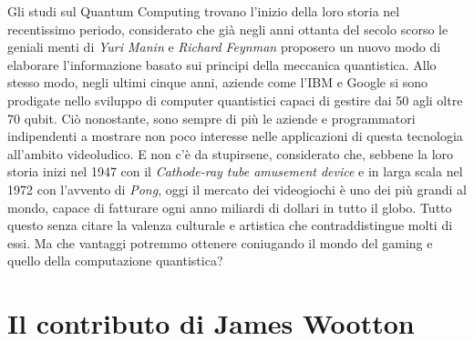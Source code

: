 \documentclass{book}
\theoremstyle{definition}
\theoremstyle{definition}
\theoremstyle{definition}
\theoremstyle{plain}
\theoremstyle{plain}
\theoremstyle{plain}
\theoremstyle{plain}
\begin{document}
Gli studi sul Quantum Computing trovano l'inizio della loro storia nel recentissimo periodo, considerato che già negli anni ottanta del secolo scorso le geniali menti di \emph{Yuri Manin} e \emph{Richard Feynman} proposero un nuovo modo di elaborare l'informazione basato sui principi della meccanica quantistica\cite{luciano_lenzini_quantum_history}. Allo stesso modo, negli ultimi cinque anni, aziende come l'IBM e Google si sono prodigate nello sviluppo di computer quantistici capaci di gestire dai 50 agli oltre 70 qubit. Ciò nonostante, sono sempre di più le
aziende e programmatori indipendenti a mostrare non poco interesse nelle applicazioni di questa tecnologia all'ambito videoludico. E non c'è da stupirsene, considerato che, sebbene la loro storia inizi nel 1947 con il \textit{Cathode-ray tube amusement device} e in larga scala nel 1972 con l'avvento di \textit{Pong}\cite{wiki:Storia_dei_videogiochi}, oggi il mercato dei videogiochi è uno dei più grandi al mondo, capace di fatturare ogni anno miliardi di dollari in tutto il globo\cite{statista_videogames_billion}. Tutto questo senza citare la valenza culturale e artistica che contraddistingue molti di essi. Ma che vantaggi potremmo ottenere coniugando il mondo del gaming e quello della computazione quantistica?


\section{Il contributo di James Wootton}
\end{document}
